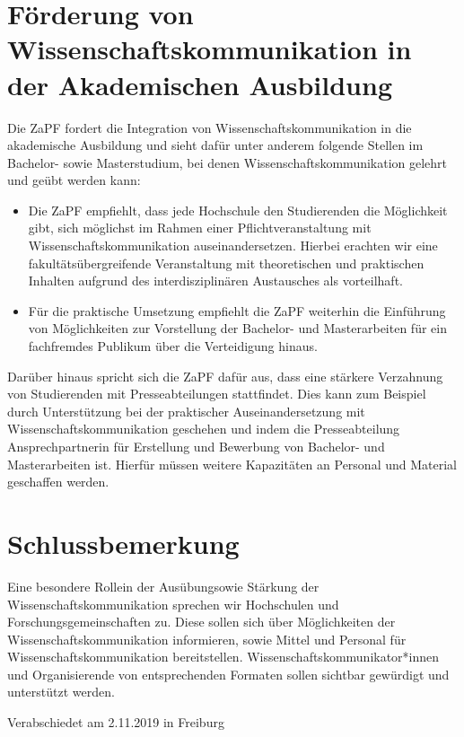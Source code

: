 \documentclass[DIV=calc]{scrartcl}
\begin{document}
\section{Förderung von Wissenschaftskommunikation in der Akademischen Ausbildung}
Die ZaPF fordert die Integration von Wissenschaftskommunikation in die akademische Ausbildung und sieht dafür unter anderem folgende Stellen im Bachelor- sowie Masterstudium, bei denen Wissenschaftskommunikation gelehrt und geübt werden kann:

\begin{itemize}
	\item Die ZaPF empfiehlt, dass jede Hochschule den Studierenden die Möglichkeit gibt, sich möglichst im Rahmen einer Pflichtveranstaltung mit Wissenschaftskommunikation auseinandersetzen. Hierbei erachten wir eine fakultätsübergreifende Veranstaltung mit theoretischen und praktischen Inhalten aufgrund des interdisziplinären Austausches als vorteilhaft.
	
	\item Für die praktische Umsetzung empfiehlt die ZaPF weiterhin die Einführung von Möglichkeiten zur Vorstellung der Bachelor- und Masterarbeiten für ein fachfremdes Publikum über die Verteidigung hinaus.
\end{itemize}
Darüber hinaus spricht sich die ZaPF dafür aus, dass eine stärkere Verzahnung von Studierenden mit Presseabteilungen stattfindet.
Dies kann zum Beispiel durch Unterstützung bei der praktischer Auseinandersetzung mit Wissenschaftskommunikation geschehen und indem die Presseabteilung Ansprechpartnerin für Erstellung und Bewerbung von Bachelor- und Masterarbeiten ist. Hierfür müssen weitere Kapazitäten an Personal und Material geschaffen werden.

\section{Schlussbemerkung}
Eine besondere Rolle\footnotemark[1] in der Ausübung\footnotemark[2] sowie Stärkung der Wissenschaftskommunikation sprechen wir Hochschulen und Forschungsgemeinschaften zu.
Diese sollen sich über Möglichkeiten der Wissenschaftskommunikation informieren, sowie Mittel und Personal für Wissenschaftskommunikation bereitstellen. 
Wissenschaftskommunikator*innen und Organisierende von entsprechenden Formaten sollen sichtbar gewürdigt und unterstützt werden.


\vfill
    \begin{flushright}
        Verabschiedet am 2.11.2019 in Freiburg
    \end{flushright}
\end{document}
